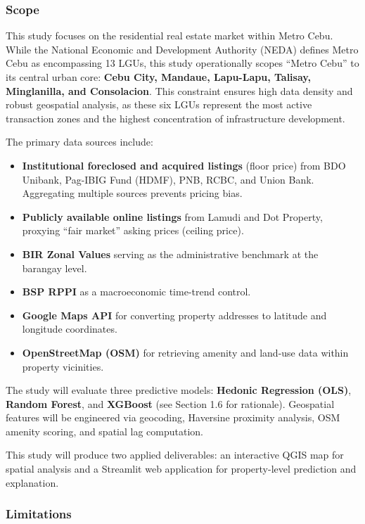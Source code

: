 \subsubsection{\texorpdfstring{\textbf{Scope}}{Scope}}\label{scope}

This study focuses on the residential real estate market within Metro Cebu. While the National Economic and Development Authority (NEDA) defines Metro Cebu as encompassing 13 LGUs, this study operationally scopes ``Metro Cebu'' to its central urban core: \textbf{Cebu City, Mandaue, Lapu-Lapu, Talisay, Minglanilla, and Consolacion}. This constraint ensures high data density and robust geospatial analysis, as these six LGUs represent the most active transaction zones and the highest concentration of infrastructure development.

The primary data sources include:

\begin{itemize}
\item \textbf{Institutional foreclosed and acquired listings} (floor price) from BDO Unibank, Pag-IBIG Fund (HDMF), PNB, RCBC, and Union Bank. Aggregating multiple sources prevents pricing bias.
\item \textbf{Publicly available online listings} from Lamudi and Dot Property, proxying ``fair market'' asking prices (ceiling price).
\item \textbf{BIR Zonal Values} serving as the administrative benchmark at the barangay level.
\item \textbf{BSP RPPI} as a macroeconomic time-trend control.
\item \textbf{Google Maps API} for converting property addresses to latitude and longitude coordinates.
\item \textbf{OpenStreetMap (OSM)} for retrieving amenity and land-use data within property vicinities.
\end{itemize}

The study will evaluate three predictive models: \textbf{Hedonic Regression (OLS)}, \textbf{Random Forest}, and \textbf{XGBoost} (see Section 1.6 for rationale). Geospatial features will be engineered via geocoding, Haversine proximity analysis, OSM amenity scoring, and spatial lag computation.

This study will produce two applied deliverables: an interactive QGIS map for spatial analysis and a Streamlit web application for property-level prediction and explanation.

\subsubsection{\texorpdfstring{\textbf{Limitations}}{Limitations}}\label{limitations}

